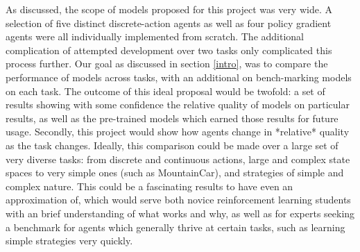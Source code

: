 \documentclass[conference]{IEEEtran}
\begin{document}
As discussed, the scope of models proposed for this project was very wide. A selection of five distinct discrete-action agents as well as four policy gradient agents were all individually implemented from scratch. The additional complication of attempted development over two tasks only complicated this process further. Our goal as discussed in section \ref{intro}, was to compare the performance of models across tasks, with an additional on bench-marking models on each task. The outcome of this ideal proposal would be twofold: a set of results showing with some confidence the relative quality of models on particular results, as well as the pre-trained models which earned those results for future usage. Secondly, this project would show how agents change in *relative* quality as the task changes. Ideally, this comparison could be made over a large set of very diverse tasks: from discrete and continuous actions, large and complex state spaces to very simple ones (such as MountainCar), and strategies of simple and complex nature. This could be a fascinating results to have even an approximation of, which would serve both novice reinforcement learning students with an brief understanding of what works and why, as well as for experts seeking a benchmark for agents which generally thrive at certain tasks, such as learning simple strategies very quickly.

{}


\vspace{12pt}
\end{document}
